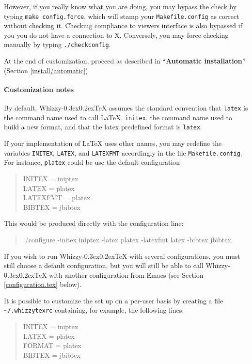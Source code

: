\documentclass[12pt]{article}
\makeatletter
\let \lst \verb
\def \whizzy {{Whizzy\kern -0.3ex\raise 0.2ex\hbox{\let \@\relax\TeX}}}
\makeatother
\begin{document}
However, if you really know what you are doing, you may bypass the check by
typing \lst"make config.force", which will stamp your \lst"Makefile.config"
as correct without checking it. Checking compliance to viewers interface
is also bypassed if you you do not have a connection to X. Conversely, you
may force checking manually by typing \lst"./checkconfig".

At the end of customization, proceed as described in ``{\bf Automatic
installation}'' (Section \ref {install/automatic})

\paragraph {Customization notes}

By default, {\whizzy} assumes the standard convention that 
\lst"latex" is the command name used to call {\LaTeX}, 
\lst"initex", the command name used to build a new format, and that the latex 
predefined format is \lst"latex".

If your implementation of {\LaTeX}
uses other names, you may redefine the variables \lst"INITEX",
\lst"LATEX", and \lst"LATEXFMT" accordingly in the file
\lst"Makefile.config".
%
For instance, \lst"platex" could be use the default configuration
\begin{quote}
\begin{tt}
INITEX = iniptex\\
LATEX = platex\\
LATEXFMT = platex\\
BIBTEX = jbibtex
\end{tt}
\end{quote}
This would be produced directly with the configuration line:
\begin{quote}
\begin{tt}
./configure -initex iniptex -latex platex -latexfmt latex -bibtex jbibtex
\end{tt}
\end{quote}
If you wish to run {\whizzy} with several configurations, you must still
choose a default configuration, but you will still be able to call {\whizzy}
with another configuration from Emacs (see Section \ref{configuration.tex}
below).

It is possible to customize the set up on a per-user basis by creating
a file \lst"~/.whizzytexrc" containing, for example, the following lines: 
\begin{quote}
\begin{tt}
INITEX = iniptex\\
LATEX = platex\\
FORMAT = platex\\
BIBTEX = jbibtex
\end{tt}
\end{quote}
\end{document}

